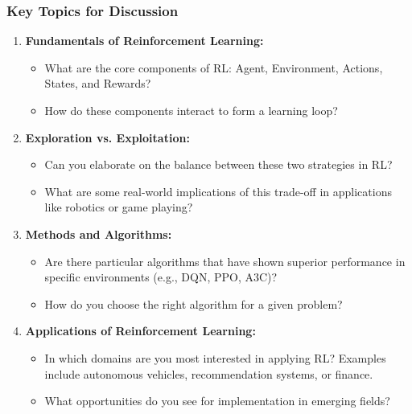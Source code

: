 \documentclass[aspectratio=169]{beamer}
\begin{document}
\begin{frame}[fragile]
    \frametitle{Key Topics for Discussion}
    \begin{enumerate}
        \item \textbf{Fundamentals of Reinforcement Learning:}
            \begin{itemize}
                \item What are the core components of RL: Agent, Environment, Actions, States, and Rewards?
                \item How do these components interact to form a learning loop?
            \end{itemize}
        
        \item \textbf{Exploration vs. Exploitation:}
            \begin{itemize}
                \item Can you elaborate on the balance between these two strategies in RL?
                \item What are some real-world implications of this trade-off in applications like robotics or game playing?
            \end{itemize}

        \item \textbf{Methods and Algorithms:}
            \begin{itemize}
                \item Are there particular algorithms that have shown superior performance in specific environments (e.g., DQN, PPO, A3C)?
                \item How do you choose the right algorithm for a given problem?
            \end{itemize}

        \item \textbf{Applications of Reinforcement Learning:}
            \begin{itemize}
                \item In which domains are you most interested in applying RL? Examples include autonomous vehicles, recommendation systems, or finance.
                \item What opportunities do you see for implementation in emerging fields?
            \end{itemize}
    \end{enumerate}
\end{frame}
\end{document}
